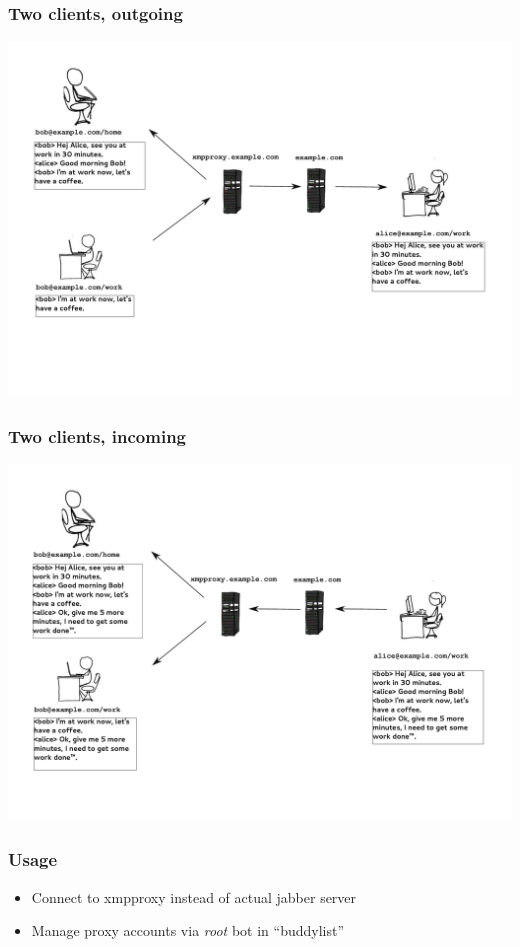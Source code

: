 \documentclass[notes=hide,yellow]{beamer}
\begin{document}
	\begin{frame}
		\frametitle{Two clients, outgoing}
		\includegraphics[scale=0.4]{../img/proxy2.pdf}
	\end{frame}
	
	\begin{frame}
		\frametitle{Two clients, incoming}
		\includegraphics[scale=0.4]{../img/proxy3.pdf}
	\end{frame}

	\begin{frame}
		\frametitle{Usage}
		\begin{itemize}
			\item Connect to xmpproxy instead of actual jabber server
			\item Manage proxy accounts via \textit{root} bot in ``buddylist''

		\end{itemize}
	\end{frame}
\end{document}
